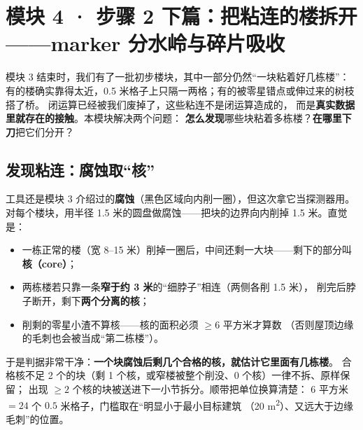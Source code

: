 \section{模块 4 · 步骤 2 下篇：把粘连的楼拆开——marker 分水岭与碎片吸收}

模块 3 结束时，我们有了一批初步楼块，其中一部分仍然``一块粘着好几栋楼''：
有的楼确实靠得太近，0.5 米格子上只隔一两格；有的被零星错点或伸过来的树枝搭了桥。
闭运算已经被我们废掉了，这些粘连不是闭运算造成的，
而是\textbf{真实数据里就存在的接触}。本模块解决两个问题：
\textbf{怎么发现}哪些块粘着多栋楼？\textbf{在哪里下刀}把它们分开？

\subsection{发现粘连：腐蚀取``核''}

工具还是模块 3 介绍过的\textbf{腐蚀}（黑色区域向内削一圈），但这次拿它当探测器用。
对每个楼块，用半径 1.5 米的圆盘做腐蚀——把块的边界向内削掉 1.5 米。直觉是：

\begin{itemize}
\item 一栋正常的楼（宽 8--15 米）削掉一圈后，中间还剩一大块——剩下的部分叫\textbf{核（core）}；
\item 两栋楼若只靠一条\textbf{窄于约 3 米}的``细脖子''相连（两侧各削 1.5 米），
      削完后脖子断开，剩下\textbf{两个分离的核}；
\item 削剩的零星小渣不算核——核的面积必须 $\geq 6$ 平方米才算数
      （否则屋顶边缘的毛刺也会被当成``第二栋楼''）。
\end{itemize}

于是判据非常干净：\textbf{一个块腐蚀后剩几个合格的核，就估计它里面有几栋楼}。
合格核不足 2 个的块（剩 1 个核，或窄楼被整个削没、0 个核）一律不拆、原样保留；
出现 $\geq 2$ 个核的块被送进下一小节拆分。顺带把单位换算清楚：
$6$ 平方米 $= 24$ 个 $0.5$ 米格子，门槛取在``明显小于最小目标建筑
（20 m\textsuperscript{2}）、又远大于边缘毛刺''的位置。

